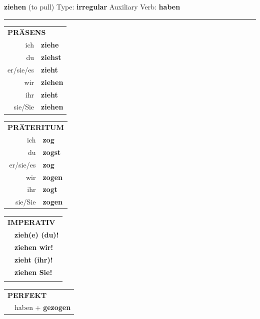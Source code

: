 \documentclass[10pt,a4paper]{revtex4-2}
\begin{document}
\begin{verbbox}
    {\Large \bf ziehen} (to pull) \hfill Type: \textbf{irregular} \hfill Auxiliary Verb: \textbf{haben} 
    
     \vspace{5pt}

    \hrule
    
    \vspace{5pt}

  \begin{tabular}{rl}
     \multicolumn{2}{l}{\textbf{PRÄSENS} }\\
    ich & \textbf{ziehe}\\
    du & \textbf{ziehst}\\
    er/sie/es & \textbf{zieht}\\
    wir & \textbf{ziehen}\\
    ihr & \textbf{zieht}\\
    sie/Sie & \textbf{ziehen}\\
  \end{tabular}
  \hfill
     \begin{tabular}{rl}
    \multicolumn{2}{l}{\textbf{PRÄTERITUM} }\\
    ich & \textbf{zog}\\
    du & \textbf{zogst}\\
    er/sie/es & \textbf{zog}\\
    wir & \textbf{zogen}\\
    ihr & \textbf{zogt}\\
    sie/Sie & \textbf{zogen}\\
  \end{tabular}
  \hfill
  \begin{tabular}{rl}
     \multicolumn{2}{l}{\textbf{IMPERATIV} }\\
   & \textbf{zieh(e) (du)!}\\
   & \textbf{ziehen wir!}\\
   & \textbf{zieht (ihr)!}\\
   & \textbf{ziehen Sie!}\\
   & \vspace{10pt}
  \end{tabular}

    \vspace{10pt}

 \begin{tabular}{rl}
     \multicolumn{2}{l}{\textbf{PERFEKT}}\\
  &  haben + \textbf{gezogen}\\
  \end{tabular}
\hfill
   \begin{tabular}{rl}
   

\end{tabular}
\end{verbbox}
\end{document}
